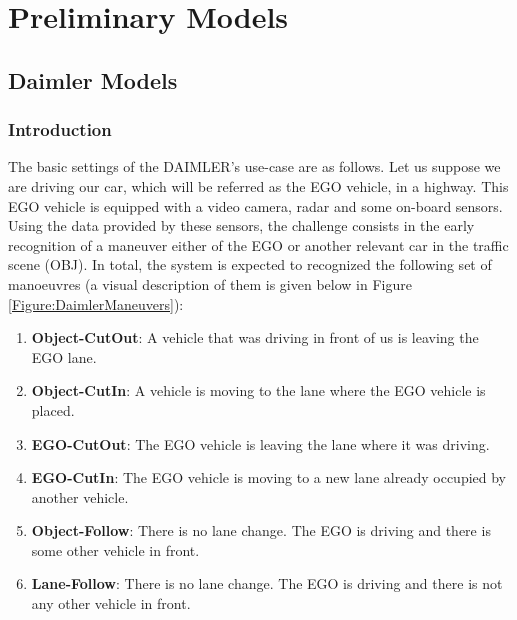 \section{Preliminary Models}
\subsection{Daimler Models}

\subsubsection*{Introduction}

The basic settings of the DAIMLER's use-case \cite{Fer14}	 are as follows. Let us suppose we are driving our car, which will be referred as the EGO vehicle, in a highway. This EGO vehicle is equipped with a video camera, radar and some on-board sensors.  Using the data provided by these sensors, the challenge consists in the early recognition of a maneuver either of the EGO or another relevant car in the traffic scene (OBJ). In total, the system is expected to recognized the following set of manoeuvres (a visual description of them is given below in Figure \ref{Figure:DaimlerManeuvers}):
\begin{enumerate}
\item \textbf{Object-CutOut}:  A vehicle that was driving in front of us is leaving the EGO lane.
\item \textbf{Object-CutIn}: A vehicle is moving to the lane where the EGO vehicle is placed.
\item \textbf{EGO-CutOut}: The EGO vehicle is leaving the lane where it was driving.
\item \textbf{EGO-CutIn}: The EGO vehicle is moving to a new lane already occupied by another vehicle. 
\item \textbf{Object-Follow}: There is no lane change. The EGO is driving and there is some other vehicle in front.
\item \textbf{Lane-Follow}: There is no lane change. The EGO is driving and there is not any other vehicle in front.
\end{enumerate}

